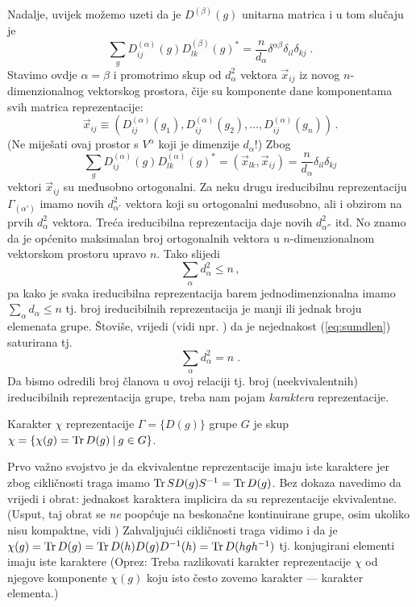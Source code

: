 Nadalje, uvijek možemo uzeti da je $D^{(\beta)}(g)$ unitarna matrica
i u tom slučaju je
\begin{displaymath}
\sum_g D^{(\alpha)}_{ij}(g) D^{(\beta)}_{lk}(g)^* =
 \frac{n}{d_{\alpha}}\delta^{\alpha\beta}\delta_{il}\delta_{kj} \;.
\end{displaymath}
Stavimo ovdje $\alpha=\beta$ i promotrimo skup od $d^{2}_\alpha$ vektora
$\vec{x}_{ij}$ iz novog $n$-dimenzionalnog vektorskog prostora,  čije
su komponente dane komponentama svih matrica reprezentacije:
\begin{displaymath}
\vec{x}_{ij} \equiv
(D^{(\alpha)}_{ij}(g_1), D^{(\alpha)}_{ij}(g_2), \ldots, 
D^{(\alpha)}_{ij}(g_n)) \,.
\end{displaymath}
(Ne miješati ovaj
prostor s $V^{\alpha}$ koji je dimenzije $d_\alpha$!) Zbog
\begin{displaymath}
\sum_g D^{(\alpha)}_{ij}(g) D^{(\alpha)}_{lk}(g)^* = (\vec{x}_{lk},\vec{x}_{ij})
 =\frac{n}{d_{\alpha}}\delta_{il}\delta_{kj}
\end{displaymath}
vektori $\vec{x}_{ij}$ su međusobno ortogonalni.
Za neku drugu ireducibilnu reprezentaciju 
$\Gamma_{(\alpha')}$ imamo novih $d_{\alpha'}^{2}$
vektora  koji su ortogonalni međusobno, ali i obzirom na prvih
$d_{\alpha}^{2}$ vektora. Treća ireducibilna reprezentacija daje novih $d_{\alpha''}^{2}$ itd.
No znamo da je općenito maksimalan broj ortogonalnih 
vektora u $n$-dimenzionalnom vektorskom prostoru upravo $n$.
Tako slijedi
\begin{equation}
\sum_{\alpha} d_{\alpha}^{2} \leq n   \,,
\label{eq:sumdlen}
\end{equation}
pa kako je svaka ireducibilna reprezentacija barem jednodimenzionalna
i\-ma\-mo $\sum_{\alpha} d_\alpha \leq n$ tj.
broj ireducibilnih reprezentacija je manji ili jednak broju elemenata grupe.
Štoviše, vrijedi (vidi npr. \cite{Hamermesh:1989}) da je nejednakost
(\ref{eq:sumdlen}) saturirana tj.
\begin{displaymath}
\sum_{\alpha} d_{\alpha}^2 = n \;.
\end{displaymath}
Da bismo odredili broj članova u ovoj relaciji tj.
broj (neekvivalentnih) ireducibilnih reprezentacija grupe, treba nam
pojam \emph{karaktera} reprezentacije.
\begin{definicija}
Karakter $\chi$ reprezentacije $\Gamma=\{D(g)\}$ grupe $G$ je skup
$\chi=\{\chi(g) = \operatorname{Tr} D(g) \: | \:  g\in G\}$.
\end{definicija}
Prvo važno svojstvo je da ekvivalentne reprezentacije imaju iste
karaktere jer zbog cikličnosti traga
imamo $\operatorname{Tr} S D(g) S^{-1} = \operatorname{Tr} D(g)$.
Bez dokaza navedimo da vrijedi i obrat: jednakost karaktera implicira
da su reprezentacije ekvivalentne.
(Usput, taj obrat se \emph{ne} poopćuje na beskonačne kontinuirane grupe, osim
  ukoliko nisu kompaktne, vidi \cite[302]{Cornwell:1997})
Zahvaljujući cikličnosti traga vidimo i da je
$\chi(g)=\operatorname{Tr} D(g) = \operatorname{Tr} D(h) D(g) D^{-1}(h) = \operatorname{Tr} D(hgh^{-1})$
  tj. konjugirani elementi imaju iste karaktere (Oprez: Treba
  razlikovati karakter reprezentacije $\chi$ od njegove komponente
  $\chi(g)$ koju isto često zovemo karakter --- karakter elementa.)

